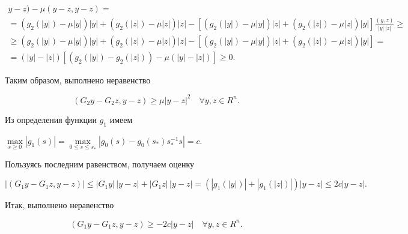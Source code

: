 \begin{pf}
\begin{gather*}
y -z \bigg) -\mu ( y -z, y -z) =\\


%


=


(g_2(|y|)- \mu|y|)|y|+(g_2(|z|)- \mu|z|)|z|-


[(g_2(|y|)- \mu|y|)|z|+(g_2(|z|) -\mu|z|)|y|]


\frac {(y, z)} {|y|\,|z|} \geq \\


%


\geq (g_2(|y|) -\mu|y|)|y|+(g_2(|z|) -\mu|z|)|z|-


[(g_2(|y|) -\mu|y|)|z|+(g_2(|z|) -\mu|z|)|y|]=\\


%


=(|y|-|z|)[(g_2(|y|) -g_2(|z|)) -\mu(|y|-|z|) ]\geq 0.


\end{gather*}





Таким образом, выполнено неравенство


\begin{equation}


(G_2 y -G_2 z, y -z) \geq \mu|y -z|^2 


\quad \forall y, z \in R^{ n}.


\label{b21_L4_04}


\end{equation}





Из определения функции $g_1$ имеем


$\max\limits_{s \geq 0 } {|g_1(s)|}=


\max\limits_{0 \leq s \leq s_* } {|g_0(s)- g_0(s_*)s_*^{-1} s|}=c$.


Пользуясь последним равенством, получаем оценку


$$


|(G_1 y -G_1 z, y -z)|\leq


|G_1 y|\,|y -z|+|G_1 z|\,|y -z|=


(|g_1(|y|)|+|g_1 (|z|)|)|y -z|\leq 2c|y -z|.


$$





Итак, выполнено неравенство


\begin{equation}


(G_1 y -G_1 z, y -z) \geq -2c|y -z|\quad \forall y, z \in R^{ n}.



\end{equation}
\end{pf}
